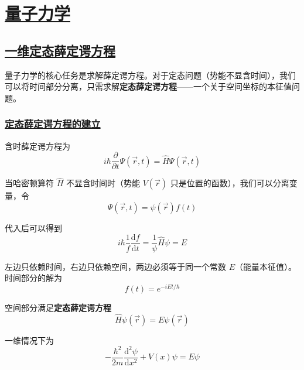 \chapter{\protect\hyperlink{:}{量子力学}}





\section{\protect\hyperlink{:}{一维定态薛定谔方程}}

量子力学的核心任务是求解薛定谔方程。对于定态问题（势能不显含时间），我们可以将时间部分分离，只需求解\textbf{定态薛定谔方程}——一个关于空间坐标的本征值问题。

\subsection{\protect\hyperlink{:}{定态薛定谔方程的建立}}

含时薛定谔方程为
\begin{equation}
    i\hbar\frac{\partial}{\partial t}\Psi(\vec{r},t) = \hat{H}\Psi(\vec{r},t)
\end{equation}

当哈密顿算符 $\hat{H}$ 不显含时间时（势能 $V(\vec{r})$ 只是位置的函数），我们可以分离变量，令
\begin{equation}
    \Psi(\vec{r},t) = \psi(\vec{r})f(t)
\end{equation}

代入后可以得到
\begin{equation}
    i\hbar\frac{1}{f}\frac{\mathrm{d}f}{\mathrm{d}t} = \frac{1}{\psi}\hat{H}\psi = E
\end{equation}

左边只依赖时间，右边只依赖空间，两边必须等于同一个常数 $E$（能量本征值）。时间部分的解为
\begin{equation}
    f(t) = e^{-iEt/\hbar}
\end{equation}

空间部分满足\textbf{定态薛定谔方程}
\begin{equation}
    \boxed{\hat{H}\psi(\vec{r}) = E\psi(\vec{r})}
\end{equation}

一维情况下为
\begin{equation}
    -\frac{\hbar^2}{2m}\frac{\mathrm{d}^2\psi}{\mathrm{d}x^2} + V(x)\psi = E\psi
\end{equation}

